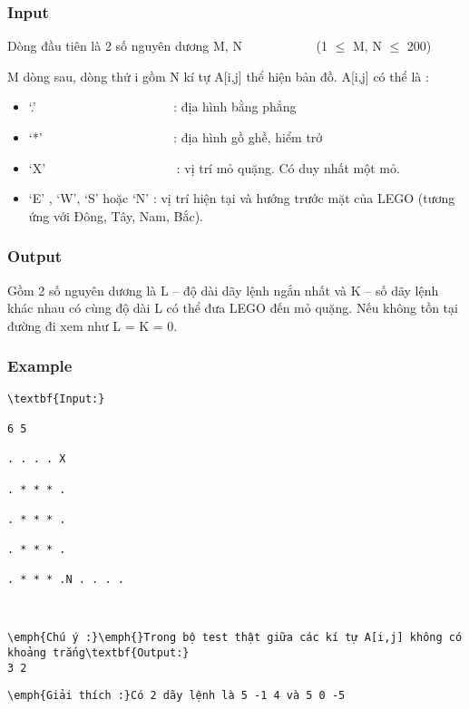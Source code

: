 \subsubsection{   Input  }

\textbf{}   Dòng đầu tiên là 2 số nguyên dương M, N            (1  $\le$  M, N  $\le$  200)  

   M dòng sau, dòng thứ i gồm N kí tự A[i,j] thể hiện bản đồ. A[i,j] có thể là :  
\begin{itemize}
	\item     ‘.’                          : địa hình bằng phẳng   
	\item     ‘*’                         : địa hình gồ ghề, hiểm trở   
	\item     ‘X’                         : vị trí mỏ quặng. Có duy nhất một mỏ.   
	\item     ‘E’ , ‘W’, ‘S’ hoặc ‘N’ : vị trí hiện tại và hướng trước mặt của LEGO (tương ứng với Đông, Tây, Nam, Bắc).   
\end{itemize}

\subsubsection{   Output  }

\textbf{}   Gồm 2 số nguyên dương là L – độ dài dãy lệnh ngắn nhất và K – số dãy lệnh khác nhau có cùng độ dài L có thể đưa LEGO đến mỏ quặng. Nếu không tồn tại đường đi xem như L = K = 0.  

\subsubsection{   Example  }
\begin{verbatim}
\textbf{Input:}

6 5

. . . . X

. * * * .

. * * * .

. * * * .

. * * * .N . . . .\end{verbatim}
\begin{verbatim}


\emph{Chú ý :}\emph{}Trong bộ test thật giữa các kí tự A[i,j] không có khoảng trắng\textbf{Output:}
3 2\end{verbatim}
\begin{verbatim}
\emph{Giải thích :}Có 2 dãy lệnh là 5 -1 4 và 5 0 -5\end{verbatim}
